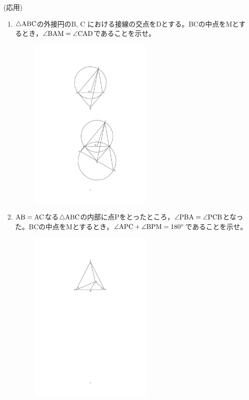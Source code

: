 \documentclass[a4paper,12pt,uplatex]{jsarticle}  %
\begin{document}
\bigskip

\newpage

 (応用)

\begin{enumerate}
\item $\triangle {\rm ABC}$の外接円のB, C における接線の交点をDとする。BCの中点をMとするとき，$\angle{\rm BAM} = \angle{\rm CAD}$であることを示せ。

\begin{figure}[ht]
  \centering
  \includegraphics[width=6.0cm]{jizen_5_1_problem.pdf}
\end{figure}

\item $\rm AB=AC$なる$\triangle {\rm ABC}$の内部に点Pをとったところ，$\angle{\rm PBA} = \angle{\rm PCB}$となった。BCの中点をMとするとき，$\angle{\rm APC} + \angle{\rm BPM}=180^{\circ}$であることを示せ。


\begin{figure}[h]
  \centering
  \includegraphics[width=6.0cm]{jizen_5_2_problem.pdf}
\end{figure}

\end{enumerate}
\end{document}
